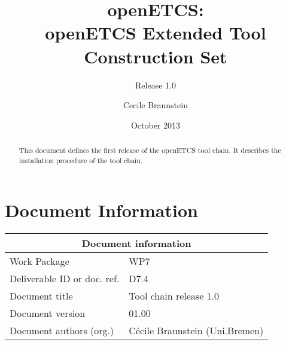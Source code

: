 \documentclass{openetcs_report}
\begin{document}
\frontmatter
{}




\title{openETCS:\\ openETCS Extended Tool Construction Set }

\subtitle{Release 1.0}

\date{October 2013}


\author{Cecile Braunstein}







\begin{abstract}
This document defines the first release of the openETCS tool chain. It
describes the installation procedure of the tool chain.
\end{abstract}

\maketitle
\tableofcontents

\newpage

\chapter{Document Information}
\begin{tabular}{|p{4.4cm}|p{8.7cm}|}
\hline
\multicolumn{2}{|c|}{Document information} \\
\hline
Work Package &  WP7  \\
Deliverable ID or doc. ref. & D7.4\\
\hline
Document title & Tool chain release 1.0 \\
Document version & 01.00 \\
Document authors (org.)  & Cécile Braunstein  (Uni.Bremen)  \\
\hline
\end{tabular}
\end{document}

